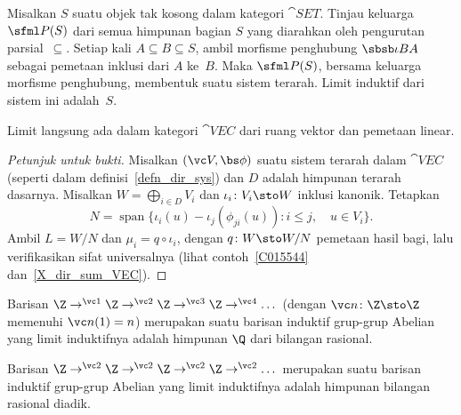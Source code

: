 \begin{exam} Misalkan $S$ suatu objek tak kosong dalam kategori $\cat{SET}$. Tinjau keluarga $\sfml P(S)$ dari semua himpunan bagian $S$ yang diarahkan
oleh pengurutan parsial~$\subseteq$.  Setiap kali $A \subseteq B \subseteq S$, ambil morfisme penghubung $\sbsb\iota{BA}$ sebagai
pemetaan inklusi dari $A$ ke~$B$. Maka $\sfml P(S)$, bersama keluarga morfisme penghubung, membentuk suatu sistem terarah.  Limit
induktif dari sistem ini adalah~$S$.
\end{exam}

\begin{exam} Limit langsung ada dalam kategori $\cat{VEC}$ dari ruang vektor dan pemetaan linear.
\end{exam}

\begin{proof}[\emph{Petunjuk untuk bukti}] Misalkan $(\vc V, \bs\phi)$ suatu sistem terarah dalam $\cat{VEC}$ (seperti dalam definisi~\ref{defn_dir_sys})
dan $D$ adalah himpunan terarah dasarnya. Misalkan
$W=\bigoplus_{i\in D}V_i$ dan $\iota_i\colon V_i\sto W$ inklusi kanonik. Tetapkan
  \[ N=\operatorname{span}\{\iota_i(u)-\iota_j(\phi_{ji}(u)):
       i\le j,\quad u\in V_i\}. \]
Ambil $L=W/N$ dan $\mu_i=q\circ\iota_i$, dengan $q\colon W\sto W/N$ pemetaan hasil bagi, lalu verifikasikan sifat universalnya
(lihat contoh~\ref{C015544} dan~\ref{X_dir_sum_VEC}).  \ns
\end{proof}

\begin{exam} Barisan $\Z \to^{\vc 1} \Z \to^{\vc 2} \Z \to^{\vc 3} \Z \to^{\vc 4} \dots$
(dengan $\vc n \colon \Z \sto \Z$ memenuhi $\vc n(1) = n$) merupakan suatu barisan induktif grup-grup Abelian
yang limit induktifnya adalah himpunan $\Q$ dari bilangan rasional.
\end{exam}

\begin{exam} Barisan $\Z \to^{\vc 2} \Z \to^{\vc 2} \Z \to^{\vc 2} \Z \to^{\vc 2} \dots$
merupakan suatu barisan induktif grup-grup Abelian yang limit induktifnya adalah himpunan bilangan rasional
diadik.
\end{exam}









